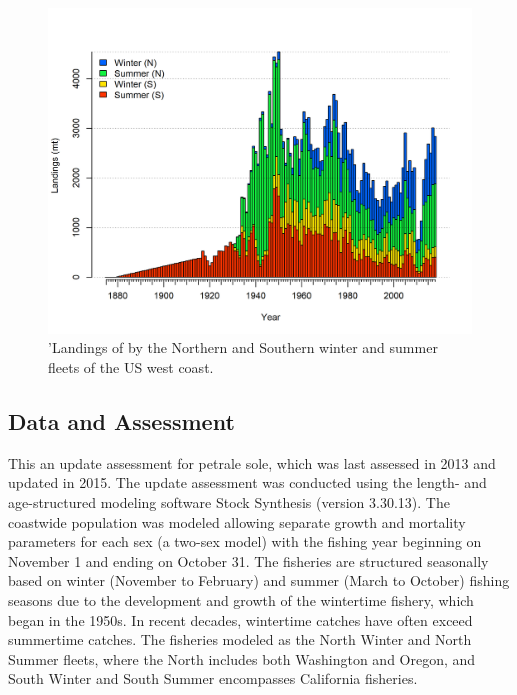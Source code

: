 \documentclass[12pt,]{article}
\begin{document}
\FloatBarrier

\begin{figure}
\centering
\includegraphics{r4ss/plots_mod1/catch2 landings stacked.png}
\caption{'Landings of by the Northern and Southern winter and summer
fleets of the US west coast. \label{fig:Exec_catch1}}
\end{figure}

\FloatBarrier

\subsection*{Data and Assessment}\label{data-and-assessment}

This an update assessment for petrale sole, which was last assessed in
2013 and updated in 2015. The update assessment was conducted using the
length- and age-structured modeling software Stock Synthesis (version
3.30.13). The coastwide population was modeled allowing separate growth
and mortality parameters for each sex (a two-sex model) with the fishing
year beginning on November 1 and ending on October 31. The fisheries are
structured seasonally based on winter (November to February) and summer
(March to October) fishing seasons due to the development and growth of
the wintertime fishery, which began in the 1950s. In recent decades,
wintertime catches have often exceed summertime catches. The fisheries
modeled as the North Winter and North Summer fleets, where the North
includes both Washington and Oregon, and South Winter and South Summer
encompasses California fisheries.
\end{document}
